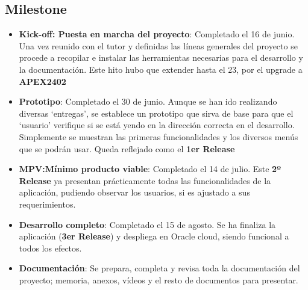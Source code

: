 \subsection{\gls{Milestone}}
\begin{itemize}
	\item \textbf{Kick-off: Puesta en marcha del proyecto}:
	Completado el 16 de junio. Una vez reunido con el tutor y definidas las líneas generales del proyecto se procede a recopilar e instalar las herramientas necesarias para el desarrollo y la documentación.
	Este hito hubo que extender hasta el 23, por el upgrade a \textbf{\acrshort{APEX}2402}
	\item \textbf{Prototipo}: Completado el 30 de junio. Aunque se han ido realizando diversas `entregas', se establece un prototipo que sirva de base para que el `usuario' verifique si se está yendo en la dirección correcta en el desarrollo. Simplemente se muestran las primeras funcionalidades y los diversos menús que se podrán usar. Queda reflejado como el \textbf{1er \gls{Release}}
	\item \textbf{\acrshort{MPV}:Mínimo producto viable}: Completado el 14 de julio. Este \textbf{2º \gls{Release}} ya presentan prácticamente todas las funcionalidades de la aplicación, pudiendo observar los usuarios, si es ajustado a sus requerimientos.
	\item \textbf{Desarrollo completo}: Completado el 15 de agosto. Se ha finaliza la aplicación (\textbf{3er \gls{Release}}) y despliega en Oracle cloud, siendo funcional a todos los efectos.
	\item \textbf{Documentación}: Se prepara, completa y revisa toda la documentación del proyecto; memoria, anexos, vídeos y el resto de documentos para presentar.
\end{itemize}
